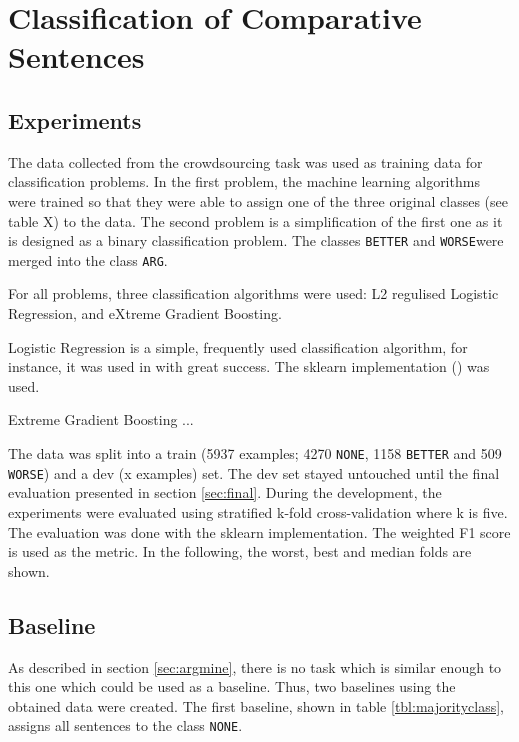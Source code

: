 \chapter{Classification of Comparative Sentences}
\section{Experiments}
The data collected from the crowdsourcing task was used as training data for classification problems. In the first problem, the machine learning algorithms were trained so that they were able to assign one of the three original classes (see table X) to the data. The second problem is a simplification of the first one as it is designed as a binary classification problem. The classes \texttt{BETTER} and \texttt{WORSE}were merged into the class \texttt{ARG}.

For all problems, three classification algorithms were used: L2 regulised Logistic Regression, and eXtreme Gradient Boosting. 

Logistic Regression is a simple, frequently used classification algorithm, for instance, it was used in \cite{Daxenberger2017What-is-the-Ess} with great success. The sklearn implementation (\cite{scikit-learn}) was used.

Extreme Gradient Boosting ...


The data was split into a train (5937 examples; 4270 \texttt{NONE}, 1158 \texttt{BETTER} and 509 \texttt{WORSE}) and a dev (x examples) set. The dev set stayed untouched until the final evaluation presented in section \ref{sec:final}. During the development, the experiments were evaluated using stratified k-fold cross-validation where k is five. The evaluation was done with the sklearn implementation. The weighted F1 score is used as the metric. In the following, the worst, best and median folds are shown.

\section{Baseline}
As described in section \ref{sec:argmine}, there is no task which is similar enough to this one which could be used as a baseline. Thus, two baselines using the obtained data were created. The first baseline, shown in table \ref{tbl:majorityclass}, assigns all sentences to the class \texttt{NONE}.



